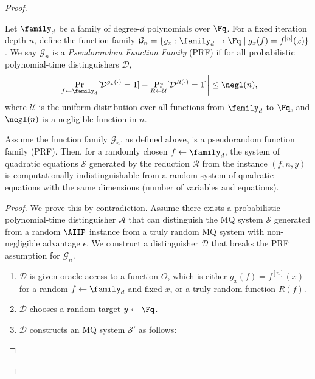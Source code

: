 \begin{proof}
\begin{definition}
                    Let $\family_d$ be a family of degree-$d$ polynomials over $\Fq$. For a fixed iteration depth $n$, define the function family $\mathcal{G}_n = \{ g_x: \family_d \to \Fq \mid g_x(f) = f^{[n]}(x) \}$.
                    We say $\mathcal{G}_n$ is a \textit{Pseudorandom Function Family} (PRF) if for all probabilistic polynomial-time distinguishers $\mathcal{D}$,
                    \begin{equation}
                        \left| \Pr_{f \leftarrow \family_d}[\mathcal{D}^{g_x(\cdot)} = 1] - \Pr_{R \leftarrow \mathcal{U}}[\mathcal{D}^{R(\cdot)} = 1] \right| \leq \negl(n),
                    \end{equation}
                    where $\mathcal{U}$ is the uniform distribution over all functions from $\family_d$ to $\Fq$, and $\negl(n)$ is a negligible function in $n$.
                \end{definition}
                \begin{lemma}[Indistinguishability]\label{lemma:indist}
                    Assume the function family $\mathcal{G}_n$, as defined above, is a pseudorandom function family (PRF). Then, for a randomly chosen $f \leftarrow \family_d$, the system of quadratic equations $\mathcal{S}$ generated by the reduction $\mathcal{R}$ from the instance $(f, n, y)$ is computationally indistinguishable from a random system of quadratic equations with the same dimensions (number of variables and equations).
                \end{lemma}
                \begin{proof}
                    We prove this by contradiction. Assume there exists a probabilistic polynomial-time distinguisher $\mathcal{A}$ that can distinguish the MQ system $\mathcal{S}$ generated from a random $\AIIP$ instance from a truly random MQ system with non-negligible advantage $\epsilon$.
                    We construct a distinguisher $\mathcal{D}$ that breaks the PRF assumption for $\mathcal{G}_n$.
                    \begin{enumerate}
                        \item $\mathcal{D}$ is given oracle access to a function $O$, which is either $g_x(f) = f^{[n]}(x)$ for a random $f \leftarrow \family_d$ and fixed $x$, or a truly random function $R(f)$.
                        \item $\mathcal{D}$ chooses a random target $y \leftarrow \Fq$.
                        \item $\mathcal{D}$ constructs an MQ system $\mathcal{S}'$ as follows:

\end{enumerate}
\end{proof}
\end{proof}
